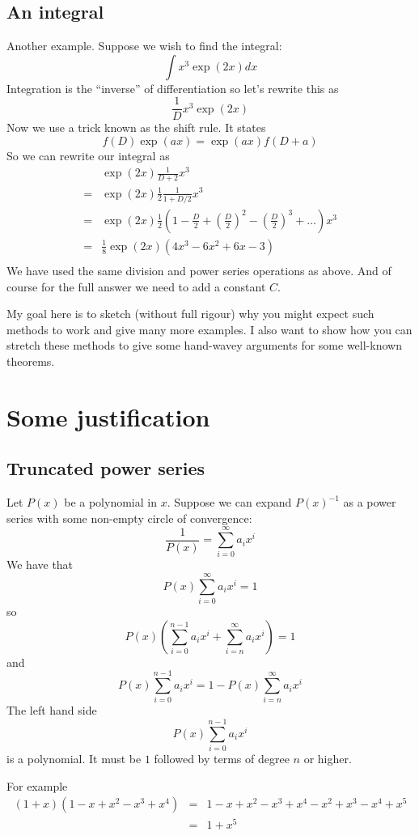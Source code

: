 \documentclass[a4paper]{article}
\theoremstyle{definition}
\begin{document}
\subsection{An integral}
Another example. Suppose we wish to find the integral:
\[
\int x^3\exp(2x) dx
\]
Integration is the ``inverse'' of differentiation so let's rewrite this as
\[
\frac{1}{D}x^3\exp(2x)
\]
Now we use a trick known as the shift rule. It states
\[
f(D)\exp(ax) = \exp(ax)f(D+a)
\]
So we can rewrite our integral as
\begin{eqnarray}
  & \exp(2x)\frac{1}{D+2}x^3 \\
= & \exp(2x)\frac{1}{2}\frac{1}{1+D/2}x^3 \\
= & \exp(2x)\frac{1}{2}(1-\frac{D}{2}+(\frac{D}{2})^2-(\frac{D}{2})^3+\ldots)x^3 \\
= & \frac{1}{8}\exp(2x)(4x^3-6x^2+6x-3) \\
\end{eqnarray}
We have used the same division and power series operations as above.
And of course for the full answer we need to add a constant $C$.

My goal here is to sketch (without full rigour) why you might expect such methods to work and give many more examples.
I also want to show how you can stretch these methods to give some hand-wavey arguments for some well-known theorems.

\section{Some justification}
\subsection{Truncated power series}
Let $P(x)$ be a polynomial in $x$.
Suppose we can expand $P(x)^{-1}$ as a power series with some non-empty circle of convergence:
\[
\frac{1}{P(x)} = \sum_{i=0}^\infty a_ix^i
\]
We have that
\[
P(x)\sum_{i=0}^\infty a_ix^i = 1
\]
so
\[
P(x)(\sum_{i=0}^{n-1} a_ix^i+\sum_{i=n}^\infty a_ix^i) = 1
\]
and
\[
P(x)\sum_{i=0}^{n-1} a_ix^i = 1-P(x)\sum_{i=n}^\infty a_ix^i
\]
The left hand side
\[
P(x)\sum_{i=0}^{n-1} a_ix^i
\]
is a polynomial.
It must be $1$ followed by terms of degree $n$ or higher.

For example
\begin{eqnarray*}
(1+x)(1-x+x^2-x^3+x^4) & = & 1-x+x^2-x^3+x^4-x^2+x^3-x^4+x^5 \\
                       & = & 1+x^5
\end{eqnarray*}
\end{document}
